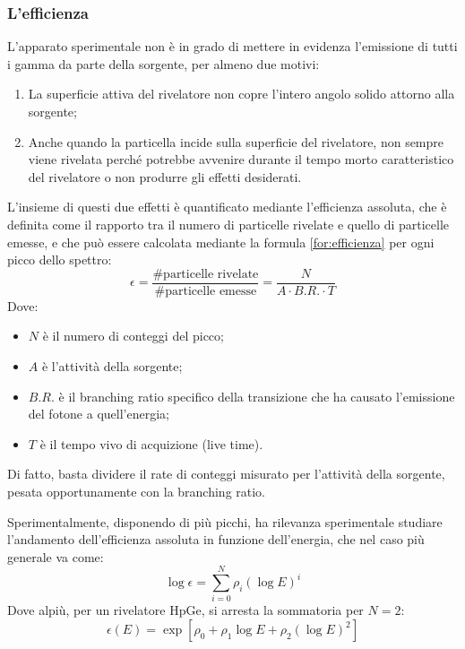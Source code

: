 \documentclass{article}
\begin{document}
            \subsubsection*{L'efficienza}
                L'apparato sperimentale non è in grado di mettere in evidenza l'emissione di tutti i gamma da parte della sorgente, per almeno due motivi:
                \begin{enumerate}
                    \item La superficie attiva del rivelatore non copre l'intero angolo solido attorno alla sorgente;
                    \item Anche quando la particella incide sulla superficie del rivelatore, non sempre viene rivelata perché potrebbe avvenire durante il tempo morto caratteristico del rivelatore o non produrre gli effetti desiderati.
                \end{enumerate}
                L'insieme di questi due effetti è quantificato mediante l'efficienza assoluta, che è definita come il rapporto tra il numero di particelle rivelate e quello di particelle emesse, e che può essere calcolata mediante la formula \eqref{for:efficienza} per ogni picco dello spettro:
                \begin{equation}\label{for:efficienza}
                    \epsilon=\frac{\text{\# particelle rivelate}}{\text{\# particelle emesse}}=\frac{N}{A\cdot B.R.\cdot T}
                \end{equation}
                Dove:
                \begin{itemize}
                    \item $N$ è il numero di conteggi del picco;
                    \item $A$ è l'attività della sorgente;
                    \item $B.R.$ è il branching ratio specifico della transizione che ha causato l'emissione del fotone a quell'energia;
                    \item $T$ è il tempo vivo di acquizione (live time).
                \end{itemize}
                Di fatto, basta dividere il rate di conteggi misurato per l'attività della sorgente, pesata opportunamente con la branching ratio.

            Sperimentalmente, disponendo di più picchi, ha rilevanza sperimentale studiare l'andamento dell'efficienza assoluta in funzione dell'energia, che nel caso più generale va come:
            \begin{equation*}
                \log{\epsilon}=\sum_{i=0}^{N} \rho_i(\log E)^i
            \end{equation*}
            Dove alpiù, per un rivelatore HpGe, si arresta la sommatoria per $N=2$:
            \begin{equation}\label{for:fit_efficienza}
                \epsilon(E)=\exp[\rho_0+\rho_1\log E+\rho_2(\log E)^2]
            \end{equation}
\end{document}
